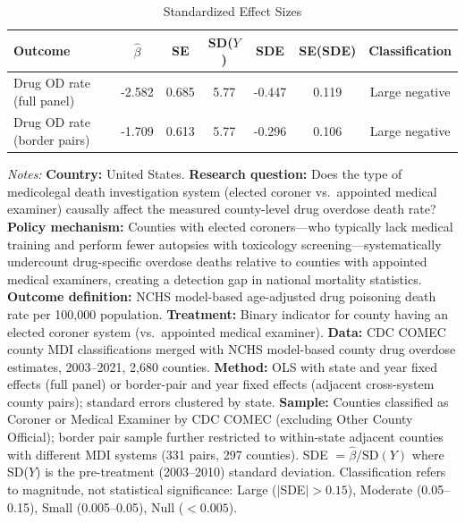 \begin{table}[t]
\centering
\caption{Standardized Effect Sizes}
\label{tab:sde}
\small
\begin{tabular}{lcccccc}
\hline\hline
Outcome & $\hat{\beta}$ & SE & SD($Y$) & SDE & SE(SDE) & Classification \\
\hline
Drug OD rate (full panel) & -2.582 & 0.685 & 5.77 & -0.447 & 0.119 & Large negative \\
Drug OD rate (border pairs) & -1.709 & 0.613 & 5.77 & -0.296 & 0.106 & Large negative \\
\hline\hline
\end{tabular}
\begin{tablenotes}
\item \textit{Notes:} \textbf{Country:} United States. \textbf{Research question:} Does the type of medicolegal death investigation system (elected coroner vs.\ appointed medical examiner) causally affect the measured county-level drug overdose death rate? \textbf{Policy mechanism:} Counties with elected coroners---who typically lack medical training and perform fewer autopsies with toxicology screening---systematically undercount drug-specific overdose deaths relative to counties with appointed medical examiners, creating a detection gap in national mortality statistics. \textbf{Outcome definition:} NCHS model-based age-adjusted drug poisoning death rate per 100,000 population. \textbf{Treatment:} Binary indicator for county having an elected coroner system (vs.\ appointed medical examiner). \textbf{Data:} CDC COMEC county MDI classifications merged with NCHS model-based county drug overdose estimates, 2003--2021, 2,680 counties. \textbf{Method:} OLS with state and year fixed effects (full panel) or border-pair and year fixed effects (adjacent cross-system county pairs); standard errors clustered by state. \textbf{Sample:} Counties classified as Coroner or Medical Examiner by CDC COMEC (excluding Other County Official); border pair sample further restricted to within-state adjacent counties with different MDI systems (331 pairs, 297 counties). SDE $= \hat{\beta} / \text{SD}(Y)$ where SD($Y$) is the pre-treatment (2003--2010) standard deviation. Classification refers to magnitude, not statistical significance: Large ($|$SDE$| > 0.15$), Moderate (0.05--0.15), Small (0.005--0.05), Null ($< 0.005$).
\end{tablenotes}
\end{table}
